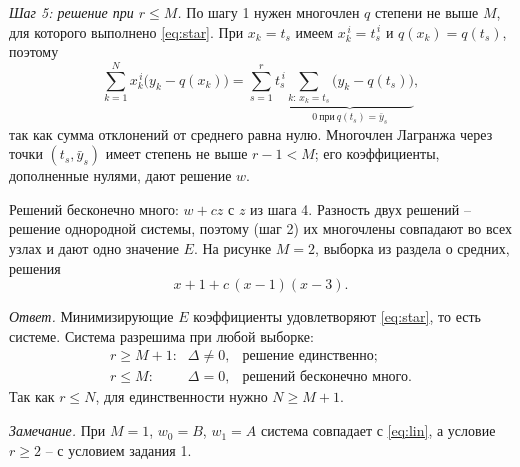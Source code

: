 \documentclass[12pt,a4paper]{article}
\begin{document}
\emph{Шаг 5: решение при $r \le M$.} По шагу 1 нужен многочлен $q$ степени не
выше $M$, для которого выполнено \eqref{eq:star}. При $x_k = t_s$ имеем
$x_k^{\,i} = t_s^{\,i}$ и $q(x_k) = q(t_s)$, поэтому
\[
  \sum_{k=1}^{N} x_k^{\,i}\bigl(y_k - q(x_k)\bigr)
  = \sum_{s=1}^{r} t_s^{\,i}
    \underbrace{\sum_{k:\,x_k = t_s}\bigl(y_k - q(t_s)\bigr)}_{0 \ \text{при}\ q(t_s) = \bar y_s} ,
\]
так как сумма отклонений от среднего равна нулю. Многочлен Лагранжа через
точки $(t_s, \bar y_s)$ имеет степень не выше $r - 1 < M$; его коэффициенты,
дополненные нулями, дают решение $w$.

\medskip\noindent
\begin{minipage}{0.53\textwidth}
Решений бесконечно много: $w + cz$ с $z$ из шага 4. Разность двух решений --
решение однородной системы, поэтому (шаг 2) их многочлены совпадают во всех
узлах и дают одно значение $E$. На рисунке $M = 2$, выборка из раздела о
средних, решения
\[
  x + 1 + c\,(x - 1)(x - 3) .
\]
\end{minipage}\hfill
\begin{minipage}{0.43\textwidth}
\centering
{}
\end{minipage}

\medskip
\emph{Ответ.} Минимизирующие $E$ коэффициенты удовлетворяют \eqref{eq:star},
то есть системе. Система разрешима при любой выборке:
\[
  \begin{array}{lll}
    r \ge M + 1\text{:} & \Delta \ne 0, & \text{решение единственно};\\[1mm]
    r \le M\text{:} & \Delta = 0, & \text{решений бесконечно много}.
  \end{array}
\]
Так как $r \le N$, для единственности нужно $N \ge M + 1$.

\emph{Замечание.} При $M = 1$, $w_0 = B$, $w_1 = A$ система совпадает с
\eqref{eq:lin}, а условие $r \ge 2$ -- с условием задания 1.
\end{document}
